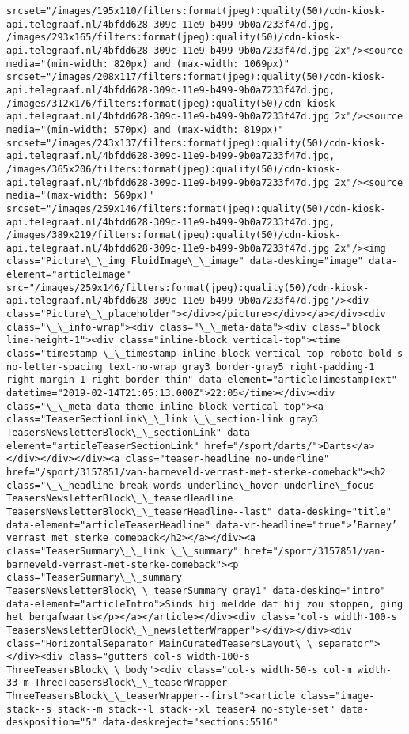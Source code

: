 \documentclass[11pt]{article}
\begin{document}
\begin{Verbatim}[commandchars=\\\{\}]
srcset="/images/195x110/filters:format(jpeg):quality(50)/cdn-kiosk-api.telegraaf.nl/4bfdd628-309c-11e9-b499-9b0a7233f47d.jpg, /images/293x165/filters:format(jpeg):quality(50)/cdn-kiosk-api.telegraaf.nl/4bfdd628-309c-11e9-b499-9b0a7233f47d.jpg 2x"/><source media="(min-width: 820px) and (max-width: 1069px)" srcset="/images/208x117/filters:format(jpeg):quality(50)/cdn-kiosk-api.telegraaf.nl/4bfdd628-309c-11e9-b499-9b0a7233f47d.jpg, /images/312x176/filters:format(jpeg):quality(50)/cdn-kiosk-api.telegraaf.nl/4bfdd628-309c-11e9-b499-9b0a7233f47d.jpg 2x"/><source media="(min-width: 570px) and (max-width: 819px)" srcset="/images/243x137/filters:format(jpeg):quality(50)/cdn-kiosk-api.telegraaf.nl/4bfdd628-309c-11e9-b499-9b0a7233f47d.jpg, /images/365x206/filters:format(jpeg):quality(50)/cdn-kiosk-api.telegraaf.nl/4bfdd628-309c-11e9-b499-9b0a7233f47d.jpg 2x"/><source media="(max-width: 569px)" srcset="/images/259x146/filters:format(jpeg):quality(50)/cdn-kiosk-api.telegraaf.nl/4bfdd628-309c-11e9-b499-9b0a7233f47d.jpg, /images/389x219/filters:format(jpeg):quality(50)/cdn-kiosk-api.telegraaf.nl/4bfdd628-309c-11e9-b499-9b0a7233f47d.jpg 2x"/><img class="Picture\_\_img FluidImage\_\_image" data-desking="image" data-element="articleImage" src="/images/259x146/filters:format(jpeg):quality(50)/cdn-kiosk-api.telegraaf.nl/4bfdd628-309c-11e9-b499-9b0a7233f47d.jpg"/><div class="Picture\_\_placeholder"></div></picture></div></a></div><div class="\_\_info-wrap"><div class="\_\_meta-data"><div class="block line-height-1"><div class="inline-block vertical-top"><time class="timestamp \_\_timestamp inline-block vertical-top roboto-bold-s no-letter-spacing text-no-wrap gray3 border-gray5 right-padding-1 right-margin-1 right-border-thin" data-element="articleTimestampText" datetime="2019-02-14T21:05:13.000Z">22:05</time></div><div class="\_\_meta-data-theme inline-block vertical-top"><a class="TeaserSectionLink\_\_link \_\_section-link gray3 TeasersNewsletterBlock\_\_sectionLink" data-element="articleTeaserSectionLink" href="/sport/darts/">Darts</a></div></div></div><a class="teaser-headline no-underline" href="/sport/3157851/van-barneveld-verrast-met-sterke-comeback"><h2 class="\_\_headline break-words underline\_hover underline\_focus TeasersNewsletterBlock\_\_teaserHeadline TeasersNewsletterBlock\_\_teaserHeadline--last" data-desking="title" data-element="articleTeaserHeadline" data-vr-headline="true">’Barney’ verrast met sterke comeback</h2></a></div><a class="TeaserSummary\_\_link \_\_summary" href="/sport/3157851/van-barneveld-verrast-met-sterke-comeback"><p class="TeaserSummary\_\_summary TeasersNewsletterBlock\_\_teaserSummary gray1" data-desking="intro" data-element="articleIntro">Sinds hij meldde dat hij zou stoppen, ging het bergafwaarts</p></a></article></div><div class="col-s width-100-s TeasersNewsletterBlock\_\_newsletterWrapper"></div></div><div class="HorizontalSeparator MainCuratedTeasersLayout\_\_separator"></div><div class="gutters col-s width-100-s ThreeTeasersBlock\_\_body"><div class="col-s width-50-s col-m width-33-m ThreeTeasersBlock\_\_teaserWrapper ThreeTeasersBlock\_\_teaserWrapper--first"><article class="image-stack--s stack--m stack--l stack--xl teaser4 no-style-set" data-deskposition="5" data-deskreject="sections:5516" 
\end{Verbatim}
\end{document}
